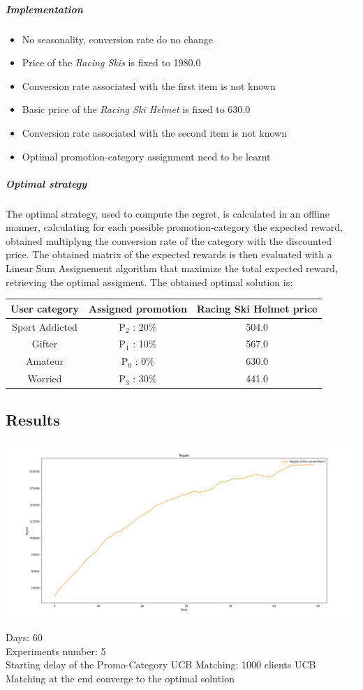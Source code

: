 \subparagraph{Implementation} 
\begin{itemize}
	\item No seasonality, conversion rate do no change
	\item Price of the \textit{Racing Skis} is fixed to 1980.0
	\item Conversion rate associated with the first item is not known
	\item Basic price of the \textit{Racing Ski Helmet} is fixed to 630.0
	\item Conversion rate associated with the second item is not known
	\item Optimal promotion-category assignment need to be learnt
\end{itemize}

\subparagraph{Optimal strategy}The optimal strategy, used to compute the regret, is calculated in an offline manner, calculating for each possible promotion-category the expected reward, obtained multiplyng the conversion rate of the category with the discounted price. The obtained matrix of the expected rewards is then evaluated with a Linear Sum Assignement algorithm that maximize the total expected reward, retrieving the optimal assigment. The obtained optimal solution is:\\
\begin{center}
	\begin{tabular}{ |c|c|c|} 
	\hline
	User category & Assigned promotion & Racing Ski Helmet price \\
	\hline
	Sport Addicted & P$_2$ : 20\% & 504.0 \\
	\hline
	Gifter & P$_1$ : 10\% & 567.0 \\
	\hline
	Amateur & P$_0$ : 0\% & 630.0 \\
	\hline
	Worried & P$_3$ : 30\% & 441.0 \\
	\hline
	\end{tabular}
\end{center}

\subsection*{Results}
\begin{center}
	\includegraphics[scale=0.30]{Images/n5}
\end{center}
Days: 60\\
Experiments number: 5 \\
Starting delay of the Promo-Category UCB Matching: 1000 clients
UCB Matching at the end converge to the optimal solution \\
